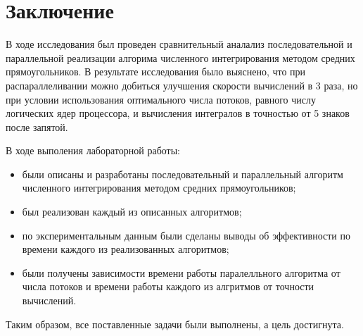 \chapter*{Заключение}

В ходе исследования был проведен сравнительный аналализ последовательной
и параллельной реализации алгорима численного интегрирования методом
средних прямоугольников. В результате исследования было выяснено, что
при распараллеливании можно добиться улучшения скорости вычислений 
в 3 раза, но при условии использования оптимального числа потоков, равного
числу логических ядер процессора, и вычисления интегралов в точностью от 5
знаков после запятой.

В ходе выполения лабораторной работы:

\begin{itemize}[left=\parindent]
    \item были описаны и разработаны последовательный и параллельный алгоритм
          численного интегрирования методом средних прямоугольников;
    \item был реализован каждый из описанных алгоритмов;
    \item по экспериментальным данным были сделаны выводы об эффективности по
          времени каждого из реализованных алгоритмов;
    \item были получены зависимости времени работы паралелльного алгоритма
          от числа потоков и времени работы каждого из алгритмов от
          точности вычислений.
\end{itemize}

Таким образом, все поставленные задачи были выполнены, а цель достигнута.

